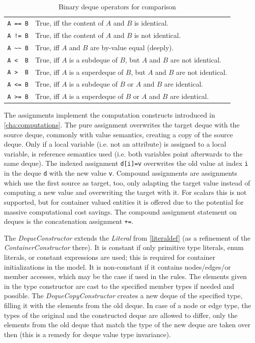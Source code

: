 \begin{table}[htbp]
  \centering
  \begin{tabularx}{\linewidth}{|l|X|}
    \hline
    \texttt{A == B} & True, iff the content of $A$ and $B$ is identical. \\
    \texttt{A != B} & True, iff the content of $A$ and $B$ is not identical. \\
    \texttt{A \textasciitilde\textasciitilde\ B} & True, iff $A$ and $B$ are by-value equal (deeply).\\
    \texttt{A <\ \ B} & True, iff $A$ is a subdeque of $B$, but $A$ and $B$ are not identical. \\
    \texttt{A >\ \ B} & True, iff $A$ is a superdeque of $B$, but $A$ and $B$ are not identical. \\
    \texttt{A <= B} & True, iff $A$ is a subdeque of $B$ or $A$ and $B$ are identical. \\
    \texttt{A >= B} & True, iff $A$ is a superdeque of $B$ or $A$ and $B$ are identical. \\
    \hline
  \end{tabularx}
  \caption{Binary deque operators for comparison}
  \label{compdeque}
\end{table}

The assignments implement the computation constructs introduced in \ref{cha:computations}.
The pure assignment overwrites the target deque with the source deque, commonly with value semantics, creating a copy of the source deque. Only if a local variable (i.e. not an attribute) is assigned to a local variable, is reference semantics used  (i.e. both variables point afterwards to the same deque).
The indexed assignment \texttt{d[i]=v} overwrites the old value at index \texttt{i} in the deque \texttt{d} with the new value \texttt{v}.
Compound assignments are assignments which use the first source as target, too,
only adapting the target value instead of computing a new value and overwriting the target with it.
For scalars this is not supported, but for container valued entities it is offered due to the potential for massive computational cost savings.
The compound assignment statement on deques is the concatenation assignment \verb#+=#.

The \emph{DequeConstructor} extends the \emph{Literal} from \ref{literaldef} (as a refinement of the \emph{ContainerConstructor} there).
It is constant if only primitive type literals, enum literals, or constant expressions are used; this is required for container initializations in the model.
It is non-constant if it contains nodes/edges/or member accesses, which may be the case if used in the rules.
The elements given in the type constructor are cast to the specified member types if needed and possible.
The \emph{DequeCopyConstructor} creates a new deque of the specified type, filling it with the elements from the old deque. 
In case of a node or edge type, the types of the original and the constructed deque are allowed to differ, 
only the elements from the old deque that match the type of the new deque are taken over then (this is a remedy for deque value type invariance).

